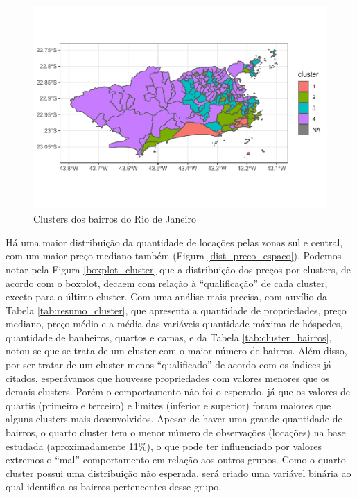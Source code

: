 \documentclass[
	12pt,				%
	a4paper,		%
	oneside,    %
	chapter=TITLE,		   %
	section=TITLE,		   %
	subsection=TITLE,	   %
	subsubsection=TITLE, %
	english,			%
	french,				%
	spanish,			%
	brazil,				%
]{abntex2}
\begin{document}
\begin{figure}
\centering
\includegraphics{00-TCC_files/figure-latex/clusters_bairros-1.pdf}
\caption{\label{clusters_bairros}Clusters dos bairros do Rio de Janeiro}
\end{figure}

Há uma maior distribuição da quantidade de locações pelas zonas sul e
central, com um maior preço mediano também (Figura
\ref{dist_preco_espaco}). Podemos notar pela Figura
\ref{boxplot_cluster} que a distribuição dos preços por clusters, de
acordo com o boxplot, decaem com relação à ``qualificação'' de cada
cluster, exceto para o último cluster. Com uma análise mais precisa, com
auxílio da Tabela \ref{tab:resumo_cluster}, que apresenta a quantidade
de propriedades, preço mediano, preço médio e a média das variáveis
quantidade máxima de hóspedes, quantidade de banheiros, quartos e camas,
e da Tabela \ref{tab:cluster_bairros}, notou-se que se trata de um
cluster com o maior número de bairros. Além disso, por ser tratar de um
cluster menos ``qualificado'' de acordo com os índices já citados,
esperávamos que houvesse propriedades com valores menores que os demais
clusters. Porém o comportamento não foi o esperado, já que os valores de
quartis (primeiro e terceiro) e limites (inferior e superior) foram
maiores que alguns clusters mais desenvolvidos. Apesar de haver uma
grande quantidade de bairros, o quarto cluster tem o menor número de
observações (locações) na base estudada (aproximadamente 11\%), o que
pode ter influenciado por valores extremos o ``mal'' comportamento em
relação aos outros grupos. Como o quarto cluster possui uma distribuição
não esperada, será criado uma variável binária ao qual identifica os
bairros pertencentes desse grupo.
\end{document}
